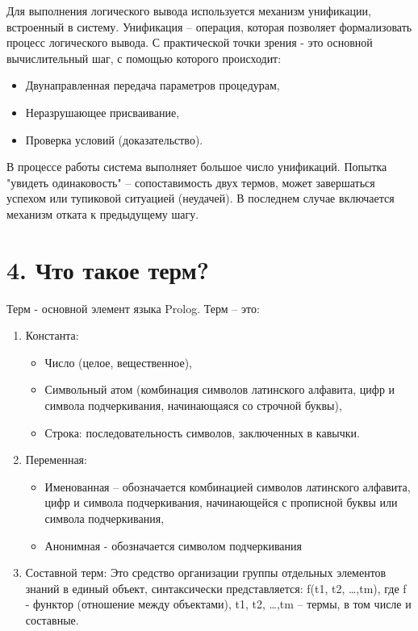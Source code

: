 \documentclass[12pt]{report}
\begin{document}
Для выполнения логического вывода используется механизм унификации, встроенный в систему.
Унификация – операция, которая позволяет формализовать процесс логического вывода. С практической точки зрения  - это основной вычислительный шаг, с помощью которого происходит:
\begin{itemize}
	\item Двунаправленная передача параметров процедурам,
	\item Неразрушающее присваивание,
	\item Проверка условий (доказательство).
\end{itemize}

В процессе работы система выполняет большое число унификаций.  Попытка "увидеть одинаковость" – сопоставимость двух термов, может завершаться успехом или тупиковой ситуацией (неудачей). В последнем случае включается механизм отката к предыдущему шагу.

\section*{4. Что такое терм?}

Терм - основной элемент языка Prolog. Терм – это:

\begin{enumerate}
	\item Константа: 
	\begin{itemize}
		\item Число (целое, вещественное),
		\item Символьный атом (комбинация символов латинского алфавита, цифр и символа подчеркивания, начинающаяся со строчной буквы),
		\item Строка: последовательность символов, заключенных в кавычки.
	\end{itemize}
	\item Переменная:
	\begin{itemize}
		\item Именованная – обозначается комбинацией символов латинского алфавита, цифр и символа подчеркивания, начинающейся с прописной буквы или символа подчеркивания,
		\item Анонимная  - обозначается символом подчеркивания
	\end{itemize}
	\item Составной терм:
	Это средство организации группы отдельных элементов знаний в единый  объект,  синтаксически представляется: f(t1, t2, …,tm), где f -  функтор (отношение между объектами), t1, t2, …,tm – термы, в том  числе  и составные.
\end{enumerate}
\end{document}
